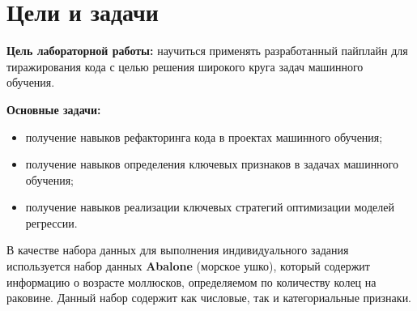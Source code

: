 \chapter*{Цели и задачи}
\label{ch:intro_lab7}

\textbf{Цель лабораторной работы:} научиться применять разработанный пайплайн для тиражирования кода с целью решения широкого круга задач машинного обучения.

\textbf{Основные задачи:}
\begin{itemize}
    \item получение навыков рефакторинга кода в проектах машинного обучения;
    \item получение навыков определения ключевых признаков в задачах машинного обучения;
    \item получение навыков реализации ключевых стратегий оптимизации моделей регрессии.
\end{itemize}

В качестве набора данных для выполнения индивидуального задания используется набор данных \textbf{Abalone} (морское ушко), который содержит информацию о возрасте моллюсков, определяемом по количеству колец на раковине. Данный набор содержит как числовые, так и категориальные признаки.

\endinput